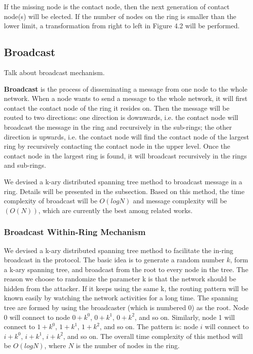 If the missing node is the contact node, then the next generation of contact node(s) will be elected. If the number of nodes on the ring is smaller than the lower limit, a transformation from right to left in Figure 4.2 will be performed.

\subsection{Broadcast} \label{broadcast}

Talk about broadcast mechanism.

\textbf{Broadcast} is the process of disseminating a message from one node to the whole network. When a node wants to send a message to the whole network, it will first contact the contact node of the ring it resides on. Then the message will be routed to two directions: one direction is downwards, i.e. the contact node will broadcast the message in the ring and recursively in the sub-rings; the other direction is upwards, i.e. the contact node will find the contact node of the largest ring by recursively contacting the contact node in the upper level. Once the contact node in the largest ring is found, it will broadcast recursively in the rings and sub-rings.

We devised a k-ary distributed spanning tree method to broadcast message in a ring. Details will be presented in the subsection. Based on this method, the time complexity of broadcast will be $O(logN)$ and message complexity will be $(O(N))$, which are currently the best among related works.

\subsubsection{Broadcast Within-Ring Mechanism}

We devised a k-ary distributed spanning tree method to facilitate the in-ring broadcast in the protocol. The basic idea is to generate a random number $k$, form a k-ary spanning tree, and broadcast from the root to every node in the tree. The reason we choose to randomize the parameter k is that the network should be hidden from the attacker. If it keeps using the same k, the routing pattern will be known easily by watching the network activities for a long time. The spanning tree are formed by using the broadcaster (which is numbered 0) as the root. Node 0 will connect to node $0+k^0$, $0+k^1$, $0+k^2$, and so on. Similarly, node 1 will connect to $1+k^0$, $1+k^1$, $1+k^2$, and so on. The pattern is: node $i$ will connect to $i+k^0$, $i+k^1$, $i+k^2$, and so on. The overall time complexity of this method will be $O(logN)$, where $N$ is the number of nodes in the ring. 

